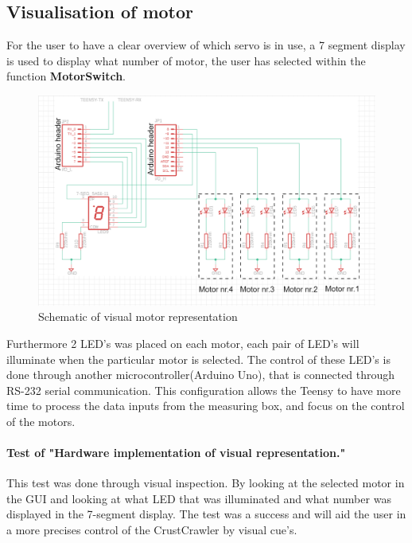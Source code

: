 \subsection*{Visualisation of motor}
For the user to have a clear overview of which servo is in use, a 7 segment display is used to display what number of motor, the user has selected within the function \textbf{MotorSwitch}.
\begin{figure}[H]\label{SchematicOfLED}
    \centering
\includegraphics[width=\textwidth]{Figures/Technical_figures/hwLEd.png}
    \caption{Schematic of visual motor representation}
    \label{fig:VismotorSel}
\end{figure}
 Furthermore 2 LED's was placed on each motor, each pair of LED's will illuminate when the particular motor is selected. The control of these LED's is done through another microcontroller(Arduino Uno), that is connected through RS-232 serial communication. This configuration allows the Teensy to have more time to process the data inputs from the measuring box, and focus on the control of the motors.
 \paragraph{Test of "Hardware implementation of visual representation."}
 This test was done through visual inspection. By looking at the selected motor in the GUI and looking at what LED that was illuminated and what number was displayed in the 7-segment display.
 The test was a success and will aid the user in a more precises control of the CrustCrawler by visual cue's.
 
 
